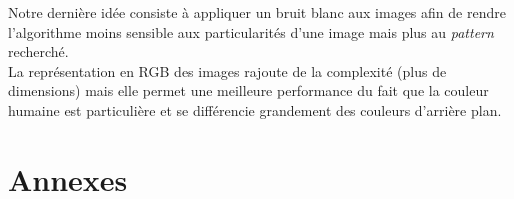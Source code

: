 \documentclass[a4paper,11pt]{article}
\begin{document}
	Notre dernière idée consiste à appliquer un bruit blanc aux images afin de rendre
	l'algorithme moins sensible aux particularités d'une image mais plus au \textit{pattern}
	recherché.\\

	La représentation en RGB des images rajoute de la complexité (plus de dimensions) mais
	elle permet une meilleure performance du fait que la couleur humaine est particulière et se
	différencie grandement des couleurs d'arrière plan.

\newpage
\section{Annexes}


\end{document}
